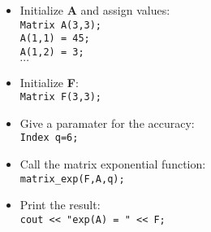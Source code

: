 \begin{itemize}
\item Initialize {\bf A} and assign values:\\
  \verb|Matrix A(3,3);|\\
  \verb|A(1,1) = 45;|\\
  \verb|A(1,2) = 3;|\\
$\cdots$ 
\item Initialize {\bf F}:\\
  \verb|Matrix F(3,3);|
\item Give a paramater for the accuracy:\\
  \verb|Index q=6;|
\item Call the matrix exponential function:\\
  \verb|matrix_exp(F,A,q);|
\item Print the result: \\
  \verb|cout << "exp(A) = " << F;|
\end{itemize}






